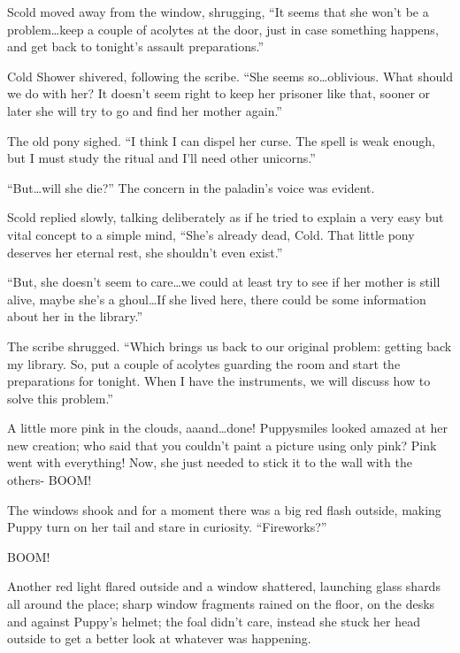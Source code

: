 Scold moved away from the window, shrugging, ``It seems that she won't be a problem\dots keep a couple of acolytes at the door, just in case something happens, and get back to tonight's assault preparations.''

Cold Shower shivered, following the scribe. ``She seems so\dots oblivious. What should we do with her? It doesn't seem right to keep her prisoner like that, sooner or later she will try to go and find her mother again.''

The old pony sighed. ``I think I can dispel her curse. The spell is weak enough, but I must study the ritual and I'll need other unicorns.''

``But\dots will she die?'' The concern in the paladin's voice was evident.

Scold replied slowly, talking deliberately as if he tried to explain a very easy but vital concept to a simple mind, ``She's already dead, Cold. That little pony deserves her eternal rest, she shouldn't even exist.''

``But, she doesn't seem to care\dots we could at least try to see if her mother is still alive, maybe she's a ghoul\dots If she lived here, there could be some information about her in the library.''

The scribe shrugged. ``Which brings us back to our original problem: getting back my library. So, put a couple of acolytes guarding the room and start the preparations for tonight. When I have the instruments, we will discuss how to solve this problem.''

\horizonline


A little more pink in the clouds, aaand\dots done! Puppysmiles looked amazed at her new creation; who said that you couldn't paint a picture using only pink? Pink went with everything! Now, she just needed to stick it to the wall with the others- BOOM!

The windows shook and for a moment there was a big red flash outside, making Puppy turn on her tail and stare in curiosity. ``Fireworks?''

BOOM!

Another red light flared outside and a window shattered, launching glass shards all around the place; sharp window fragments rained on the floor, on the desks and against Puppy's helmet; the foal didn't care, instead she stuck her head outside to get a better look at whatever was happening.

